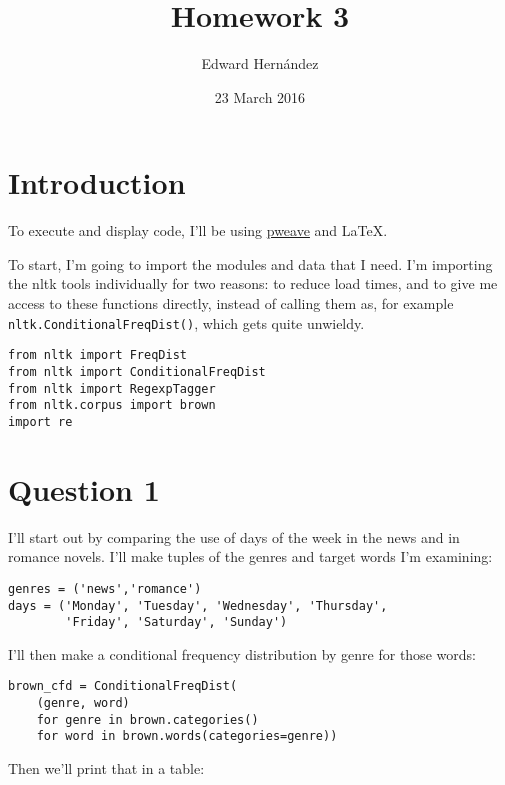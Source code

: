 \documentclass[man,12pt]{apa6}
\begin{document}
\title{Homework 3}
\author{Edward Hern\'{a}ndez}
\date{23 March 2016}
\maketitle

\section{Introduction}

To execute and display code, I'll be using
\href{http://mpastell.com/pweave}{pweave} and \LaTeX.

To start, I'm going to import the modules and data that I need.  I'm importing
the nltk tools individually for two reasons: to reduce load times, and to give
me access to these functions directly, instead of calling them as, for example
\texttt{nltk.ConditionalFreqDist()}, which gets quite unwieldy.


\begin{verbatim}
from nltk import FreqDist
from nltk import ConditionalFreqDist
from nltk import RegexpTagger
from nltk.corpus import brown
import re
\end{verbatim}


\section{Question 1}

I'll start out by comparing the use of days of the week in the news and in
romance novels. I'll make tuples of the genres and target words I'm examining:

\begin{verbatim}
genres = ('news','romance')
days = ('Monday', 'Tuesday', 'Wednesday', 'Thursday',
        'Friday', 'Saturday', 'Sunday')
\end{verbatim}

I'll then make a conditional frequency distribution by genre for those words:

\begin{verbatim}
brown_cfd = ConditionalFreqDist(
    (genre, word)
    for genre in brown.categories()
    for word in brown.words(categories=genre))
\end{verbatim}

Then we'll print that in a table:
\end{document}
